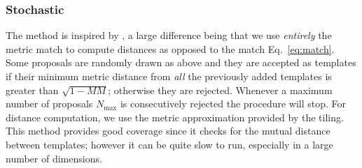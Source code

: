 \documentclass[twocolumn,showpacs,preprintnumbers,nofootinbib,prd,
superscriptaddress,10pt]{revtex4-2}
\begin{document}

\subsubsection{Stochastic}\label{par:stochastic}
The method is inspired by \cite{PhysRevD.80.104014}, a large difference being that we use {\it entirely} the metric match to compute distances as opposed to the match Eq.~\eqref{eq:match}.
\\
Some proposals are randomly drawn as above and they are accepted as templates if their minimum metric distance from {\it all} the previously added templates is greater than  $\sqrt{1-MM}$; otherwise they are rejected.
Whenever a maximum number of proposals $N_\text{max}$ is consecutively rejected the procedure will stop. For distance computation, we use the metric approximation provided by the tiling.
\\
This method provides good coverage since it checks for the mutual distance between templates; however it can be quite slow to run, especially in a large number of dimensions.
\end{document}
